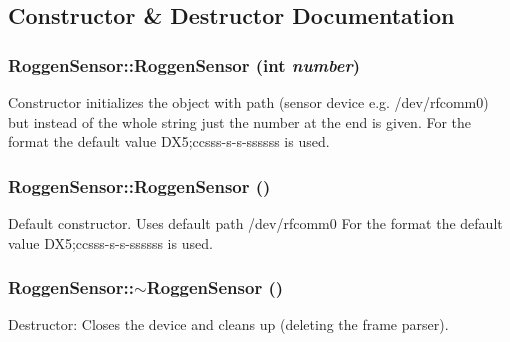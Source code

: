 \subsection{Constructor \& Destructor Documentation}
\hypertarget{classRoggenSensor_a389b05fdb6e19f82241ac1d33cb07b59}{
\subsubsection[{RoggenSensor}]{\setlength{\rightskip}{0pt plus 5cm}RoggenSensor::RoggenSensor (int {\em number})}}
\label{classRoggenSensor_a389b05fdb6e19f82241ac1d33cb07b59}
Constructor initializes the object with path (sensor device e.g. /dev/rfcomm0) but instead of the whole string just the number at the end is given. For the format the default value DX5;ccsss-\/s-\/s-\/ssssss is used. \hypertarget{classRoggenSensor_afe189b0bcb2e2eaf7090f60e3277eec4}{
\subsubsection[{RoggenSensor}]{\setlength{\rightskip}{0pt plus 5cm}RoggenSensor::RoggenSensor ()}}
\label{classRoggenSensor_afe189b0bcb2e2eaf7090f60e3277eec4}
Default constructor. Uses default path /dev/rfcomm0 For the format the default value DX5;ccsss-\/s-\/s-\/ssssss is used. \hypertarget{classRoggenSensor_acd713d1615cd040b8691e24beb21c73e}{
\subsubsection[{$\sim$RoggenSensor}]{\setlength{\rightskip}{0pt plus 5cm}RoggenSensor::$\sim$RoggenSensor ()}}
\label{classRoggenSensor_acd713d1615cd040b8691e24beb21c73e}
Destructor: Closes the device and cleans up (deleting the frame parser). 

